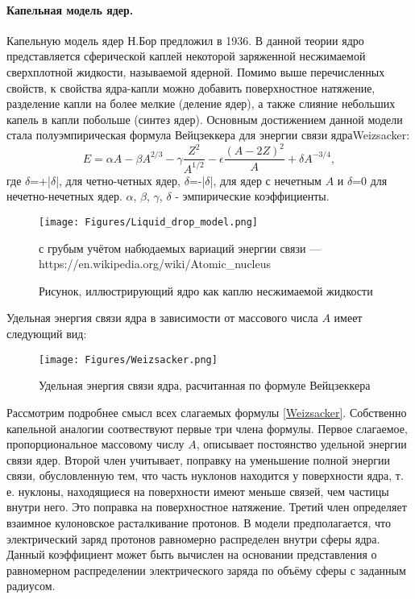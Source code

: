 \documentclass[a5paper,openany]{book}
\begin{document}
	\paragraph{Капельная модель ядер.}
	Капельную модель ядер Н.Бор предложил в 1936. В данной теории ядро представляется сферической каплей некоторой заряженной несжимаемой сверхплотной жидкости, называемой ядерной. Помимо выше перечисленных свойств, к свойства ядра-капли можно добавить поверхностное натяжение, разделение капли на более мелкие (деление ядер), а также слияние небольших капель в капли побольше (синтез ядер). Основным достижением данной модели стала полуэмпирическая формула Вейцзеккера для энергии связи ядра{Weizsacker}:
	\begin{equation}\label{Weizsacker}
	E={\alpha}A-{\beta}A^{2/3}-{\gamma}\frac{Z^2} {A^{1/2}}-{\epsilon}\frac{(A-2Z)^2} {A} +{\delta}A^{-3/4},
	\end{equation}
	где $\delta$=+|$\delta$|, для четно-четных ядер,  $\delta$=-|$\delta$|, для ядер с нечетным $A$ и $\delta$=0 для нечетно-нечетных ядер. $\alpha$,  $\beta$, $\gamma$, $\delta$ - эмпирические коэффициенты. 

	\begin{figure}[ht] 
	\centering\small
	\unitlength=1mm
	\texttt{[image: Figures/Liquid\_drop\_model.png]} 
	\caption{Рисунок, иллюстрирующий ядро как каплю несжимаемой жидкости} с грубым учётом набюдаемых вариаций энергии связи --- https://en.wikipedia.org/wiki/Atomic\_nucleus
	\label{f:Liquid_drop_model}
\end{figure}
	
	
	Удельная энергия связи ядра в зависимости от массового числа $A$ имеет следующий вид:
	\begin{figure}[ht] 
		\centering\small
		\unitlength=1mm
		\texttt{[image: Figures/Weizsacker.png]} 
		\caption{Удельная энергия связи ядра, расчитанная по формуле Вейцзеккера} 
		\label{f:Weizsacker}
	\end{figure}

	Рассмотрим подробнее смысл всех слагаемых формулы \eqref{Weizsacker}. Собственно капельной  аналогии соотвествуют первые три члена формулы. Первое слагаемое, пропорциональное массовому числу $A$,  описывает постоянство удельной энергии связи ядер. Второй член учитывает, поправку на уменьшение полной энергии связи, обусловленную тем, что часть нуклонов находится у поверхности ядра, т. е. нуклоны, находящиеся на поверхности имеют меньше связей, чем частицы внутри него. Это поправка на поверхностное натяжение. Третий член определяет взаимное кулоновское расталкивание протонов. В модели предполагается, что электрический заряд протонов равномерно распределен внутри сферы ядра. Данный коэффициент может быть вычислен на основании представления о равномерном распределении электрического заряда по объёму сферы с заданным радиусом. 
\end{document}
